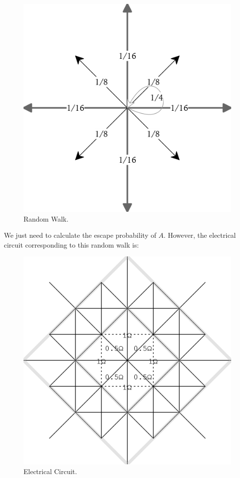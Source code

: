 \documentclass[paper=a4, fontsize=11pt]{scrartcl} %
\numberwithin{equation}{section} %
\numberwithin{figure}{section} %
\numberwithin{table}{section} %
\begin{document}
\begin{figure}[H]
	\centering
	\includegraphics[width=350pt]{walk.png}
	\caption{Random Walk.}
\end{figure}

We just need to calculate the escape probability of $A$. However, the electrical circuit corresponding to this random walk is:

\begin{figure}[H]
	\centering
	\includegraphics[width=350pt]{whole.png}
	\caption{Electrical Circuit.}
\end{figure}
\end{document}
